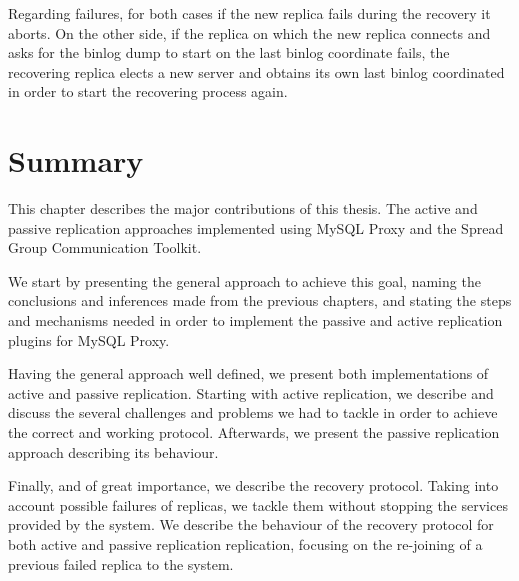 Regarding failures, for both cases if the new replica fails during the recovery it aborts. On the other side, if the replica on which the new replica connects and asks for the binlog dump to start on the last binlog coordinate fails, the recovering replica elects a new server and obtains its own last binlog coordinated in order to start the recovering process again.

\section{Summary}

This chapter describes the major contributions of this thesis. The active and passive replication approaches implemented using MySQL Proxy and the Spread Group Communication Toolkit. 

We start by presenting the general approach to achieve this goal, naming the conclusions and inferences made from the previous chapters, and stating the steps and mechanisms needed in order to implement the passive and active replication plugins for MySQL Proxy.

Having the general approach well defined, we present both implementations of active and passive replication. Starting with active replication, we describe and discuss the several challenges and problems we had to tackle in order to achieve the correct and working protocol. Afterwards, we present the passive replication approach describing its behaviour.

Finally, and of great importance, we describe the recovery protocol. Taking into account possible failures of replicas, we tackle them without stopping the services provided by the system. We describe the behaviour of the recovery protocol for both active and passive replication replication, focusing on the re-joining of a previous failed replica to the system.